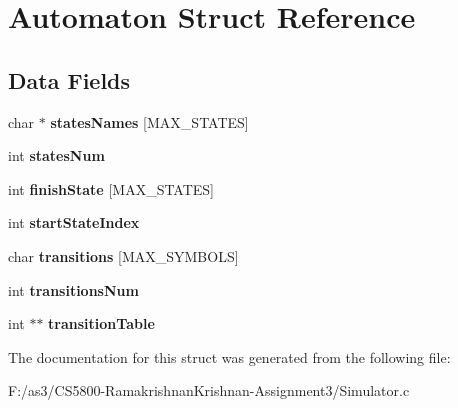 \hypertarget{struct_automaton}{}\section{Automaton Struct Reference}
\label{struct_automaton}
\subsection*{Data Fields}
\begin{DoxyCompactItemize}
\item 
\hypertarget{struct_automaton_aa38a697376b7aae2754aa4f50d400a23}{}char $\ast$ {\bfseries states\+Names} \mbox{[}M\+A\+X\+\_\+\+S\+T\+A\+T\+E\+S\mbox{]}\label{struct_automaton_aa38a697376b7aae2754aa4f50d400a23}

\item 
\hypertarget{struct_automaton_a53bccc89c4faf85fccbbdffbaa4930ae}{}int {\bfseries states\+Num}\label{struct_automaton_a53bccc89c4faf85fccbbdffbaa4930ae}

\item 
\hypertarget{struct_automaton_a38d28661a1c8817c64b04d2564e86fe1}{}int {\bfseries finish\+State} \mbox{[}M\+A\+X\+\_\+\+S\+T\+A\+T\+E\+S\mbox{]}\label{struct_automaton_a38d28661a1c8817c64b04d2564e86fe1}

\item 
\hypertarget{struct_automaton_a04a2e4c5a79fee97edd899a00aaac06b}{}int {\bfseries start\+State\+Index}\label{struct_automaton_a04a2e4c5a79fee97edd899a00aaac06b}

\item 
\hypertarget{struct_automaton_a87031097fc8a1ecd3b75b8af7d17f9f3}{}char {\bfseries transitions} \mbox{[}M\+A\+X\+\_\+\+S\+Y\+M\+B\+O\+L\+S\mbox{]}\label{struct_automaton_a87031097fc8a1ecd3b75b8af7d17f9f3}

\item 
\hypertarget{struct_automaton_ad770ab01a8203553192ebe3ece9570fa}{}int {\bfseries transitions\+Num}\label{struct_automaton_ad770ab01a8203553192ebe3ece9570fa}

\item 
\hypertarget{struct_automaton_ad886b3a037fb1e8c7141e4c73a897243}{}int $\ast$$\ast$ {\bfseries transition\+Table}\label{struct_automaton_ad886b3a037fb1e8c7141e4c73a897243}

\end{DoxyCompactItemize}


The documentation for this struct was generated from the following file\+:\begin{DoxyCompactItemize}
\item 
F\+:/as3/\+C\+S5800-\/\+Ramakrishnan\+Krishnan-\/\+Assignment3/Simulator.\+c\end{DoxyCompactItemize}
